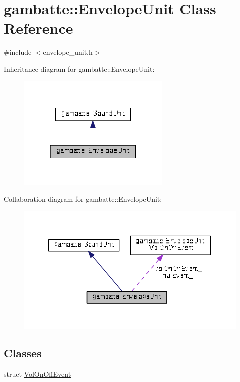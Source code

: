 \hypertarget{classgambatte_1_1EnvelopeUnit}{}\section{gambatte\+:\+:Envelope\+Unit Class Reference}
\label{classgambatte_1_1EnvelopeUnit}


{\ttfamily \#include $<$envelope\+\_\+unit.\+h$>$}



Inheritance diagram for gambatte\+:\+:Envelope\+Unit\+:\nopagebreak
\begin{figure}[H]
\begin{center}
\leavevmode
\includegraphics[width=208pt]{classgambatte_1_1EnvelopeUnit__inherit__graph}
\end{center}
\end{figure}


Collaboration diagram for gambatte\+:\+:Envelope\+Unit\+:
\nopagebreak
\begin{figure}[H]
\begin{center}
\leavevmode
\includegraphics[width=340pt]{classgambatte_1_1EnvelopeUnit__coll__graph}
\end{center}
\end{figure}
\subsection*{Classes}
\begin{DoxyCompactItemize}
\item 
struct \hyperlink{structgambatte_1_1EnvelopeUnit_1_1VolOnOffEvent}{Vol\+On\+Off\+Event}
\end{DoxyCompactItemize}
